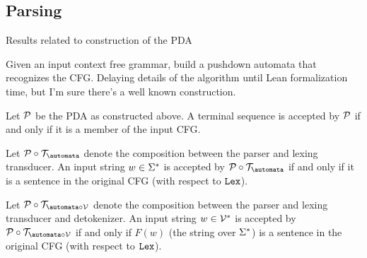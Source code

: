 \subsection{Parsing}
Results related to construction of the PDA
\begin{definition}[Parser]
    \label{def:Parser}
    Given an input context free grammar, build a pushdown automata that recognizes the CFG. Delaying details of the algorithm until Lean formalization time, but I'm sure there's a well known construction.
\end{definition}

\begin{theorem} 
    \label{thm:ParserEquivCFG}
    Let $\mathcal{P}$ be the PDA as constructed above. A terminal sequence is accepted by $\mathcal{P}$ if and only if it is a member of the input CFG.
\end{theorem}

\begin{theorem} 
    \label{thm:ParserLexerEquivCFGSentences}
    Let $\pushdown \circ \transducer_{\automata}$ denote the composition between the parser and lexing transducer.
    An input string $w \in \Sigma^{*}$ is accepted by $\pushdown \circ \transducer_{\automata}$ if and only if it is a sentence in the original CFG (with respect to $\mathtt{Lex}$).
\end{theorem}

\begin{theorem} 
    \label{thm:ParserLexerDetokenizerEquivCFGSentences}
    Let $\pushdown \circ \transducer_{\automata \circ \vocab}$ denote the composition between the parser and lexing transducer and detokenizer.
    An input string $w \in \mathcal{V}^{*}$ is accepted by $\pushdown \circ \transducer_{\automata \circ \vocab}$ if and only if $F(w)$ (the string over $\Sigma^{*}$) is a sentence in the original CFG (with respect to $\mathtt{Lex}$).
\end{theorem}
